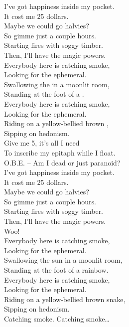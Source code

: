 I've got happiness inside my pocket. \\
It cost me 25 dollars. \\
Maybe we could go halvies? \\
So gimme just a couple hours. \\
Starting fires with soggy timber. \\
Then, I'll have the magic powers. \\

Everybody here is catching smoke, \\
Looking for the ephemeral. \\
Swallowing the  in a moonlit room, \\
Standing at the foot of a . \\
Everybody here is catching smoke, \\
Looking for the ephemeral. \\
Riding on a yellow-bellied brown , \\
Sipping on hedonism. \\

Give me 5, it's all I need \\
To inscribe my epitaph while I float. \\ 
O.B.E. -- Am I dead or just paranoid? \\

I've got happiness inside my pocket. \\
It cost me 25 dollars. \\
Maybe we could go halvies? \\
So gimme just a couple hours. \\
Starting fires with soggy timber. \\
Then, I'll have the magic powers. \\
Woo! \\

Everybody here is catching smoke, \\
Looking for the ephemeral. \\
Swallowing the sun in a moonlit room, \\
Standing at the foot of a rainbow. \\
Everybody here is catching smoke, \\
Looking for the ephemeral. \\
Riding on a yellow-bellied brown snake, \\
Sipping on hedonism. \\

Catching smoke. Catching smoke… \\

